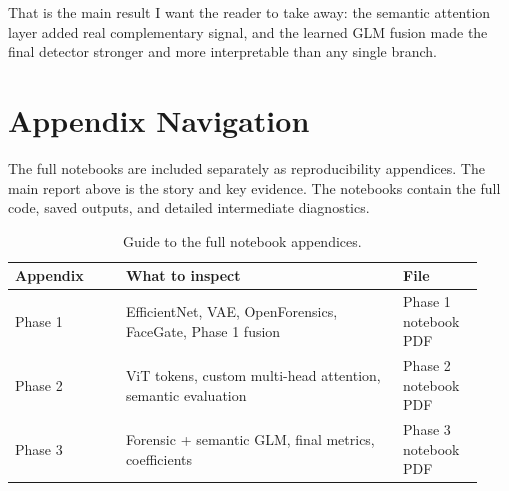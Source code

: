 \documentclass[11pt]{article}
\begin{document}
That is the main result I want the reader to take away: the semantic attention layer added real complementary signal, and the learned GLM fusion made the final detector stronger and more interpretable than any single branch.

\section{Appendix Navigation}

The full notebooks are included separately as reproducibility appendices. The main report above is the story and key evidence. The notebooks contain the full code, saved outputs, and detailed intermediate diagnostics.

\begin{table}[H]
\centering
\begin{tabular}{p{0.22\linewidth}p{0.55\linewidth}p{0.16\linewidth}}
\toprule
Appendix & What to inspect & File \\
\midrule
Phase 1 & EfficientNet, VAE, OpenForensics, FaceGate, Phase 1 fusion & Phase 1 notebook PDF \\
Phase 2 & ViT tokens, custom multi-head attention, semantic evaluation & Phase 2 notebook PDF \\
Phase 3 & Forensic + semantic GLM, final metrics, coefficients & Phase 3 notebook PDF \\
\bottomrule
\end{tabular}
\caption{Guide to the full notebook appendices.}
\label{tab:appendix-guide}
\end{table}



\end{document}
